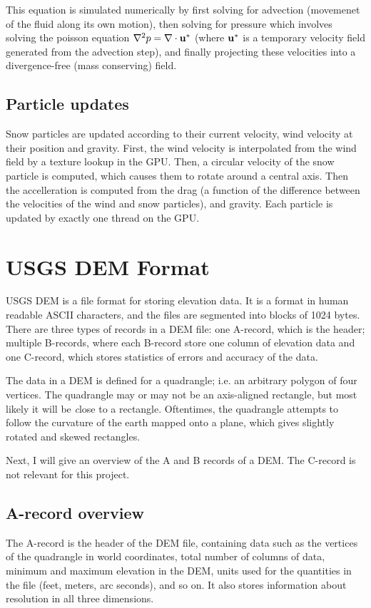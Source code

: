 This equation is simulated numerically by first solving for advection (movemenet of the fluid along its own motion), then solving for pressure which involves solving the poisson equation $\nabla^2 p = \nabla\cdot {\mathbf u}^*$ (where ${\mathbf u}^*$ is a temporary velocity field generated from the advection step), and finally projecting these velocities into a divergence-free (mass conserving) field\cite{snowsim1}.

\subsection{Particle updates}
Snow particles are updated according to their current velocity, wind velocity at their position and gravity.\cite{snowsim1} First, the wind velocity is interpolated from the wind field by a texture lookup in the GPU. Then, a circular velocity of the snow particle is computed, which causes them to rotate around a central axis. Then the accelleration is computed from the drag (a function of the difference between the velocities of the wind and snow particles), and gravity. Each particle is updated by exactly one thread on the GPU.

\section{USGS DEM Format}
USGS DEM is a file format for storing elevation data. It is a format in human readable ASCII characters, and the files are segmented into blocks of 1024 bytes. There are three types of records in a DEM file: one A-record, which is the header; multiple B-records, where each B-record store one column of elevation data and one C-record, which stores statistics of errors and accuracy of the data.\cite{usgsdem}

The data in a DEM is defined for a quadrangle; i.e. an arbitrary polygon of four vertices. The quadrangle may or may not be an axis-aligned rectangle, but most likely it will be {\textit close} to a rectangle. Oftentimes, the quadrangle attempts to follow the curvature of the earth mapped onto a plane, which gives slightly rotated and skewed rectangles.

Next, I will give an overview of the A and B records of a DEM. The C-record is not relevant for this project.

\subsection{A-record overview}
The A-record is the header of the DEM file, containing data such as the vertices of the quadrangle in world coordinates, total number of columns of data, minimum and maximum elevation in the DEM, units used for the quantities in the file (feet, meters, arc seconds), and so on. It also stores information about resolution in all three dimensions. 

